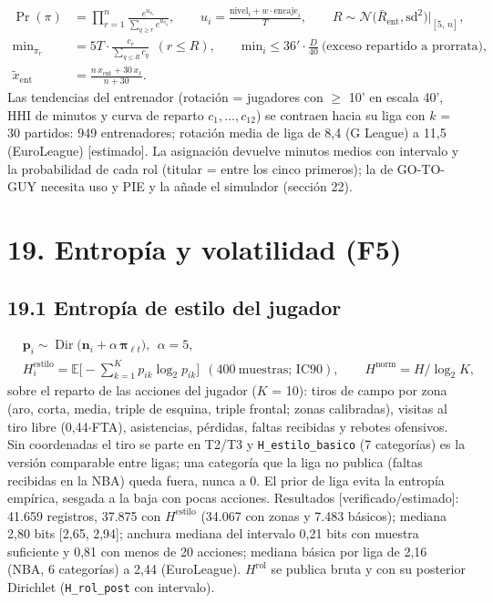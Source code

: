 \documentclass[10pt,a4paper]{article}
\begin{document}
\[
\begin{aligned} \Pr(\pi) &= \prod_{r=1}^{n} \frac{e^{u_{\pi_r}}}{\sum_{q \ge r} e^{u_{\pi_q}}}, \qquad u_i = \frac{\text{nivel}_i + w\cdot\text{encaje}_i}{T}, \qquad R \sim \mathcal N\big(\bar R_{\mathrm{ent}}, \mathrm{sd}^2\big)\big|_{[5,\,n]},\\ \mathrm{min}_{\pi_r} &= 5T \cdot \frac{c_r}{\sum_{q \le R} c_q}\ \ (r \le R), \qquad \mathrm{min}_i \le 36' \cdot \tfrac{D}{40}\ \text{(exceso repartido a prorrata)},\\ \tilde x_{\mathrm{ent}} &= \frac{n\,x_{\mathrm{ent}} + 30\,x_\ell}{n + 30} . \end{aligned}
\]
Las tendencias del entrenador (rotación = jugadores con \ensuremath{\geq} 10' en escala 40', HHI de minutos y curva de reparto $c_1,\dots,c_{12}$) se contraen hacia su liga con $k$ = 30 partidos: 949 entrenadores; rotación media de liga de 8,4 (G League) a 11,5 (EuroLeague) [estimado]. La asignación devuelve minutos medios con intervalo y la probabilidad de cada rol (titular = entre los cinco primeros); la de GO-TO-GUY necesita uso y PIE y la añade el simulador (sección 22).


\section*{19. Entropía y volatilidad (F5)}
\subsection*{19.1 Entropía de estilo del jugador}
\[
\begin{aligned} &\mathbf p_i \sim \operatorname{Dir}\big(\mathbf n_i + \alpha\,\boldsymbol\pi_{\ell t}\big),\ \ \alpha = 5,\\ &H^{\mathrm{estilo}}_i = \mathbb E\Big[-\sum_{k=1}^{K} p_{ik}\log_2 p_{ik}\Big] \ \ (400\ \text{muestras; IC90}), \qquad H^{\mathrm{norm}} = H/\log_2 K , \end{aligned}
\]
sobre el reparto de las acciones del jugador ($K$ = 10): tiros de campo por zona (aro, corta, media, triple de esquina, triple frontal; zonas calibradas), visitas al tiro libre (0,44\ensuremath{\cdot}FTA), asistencias, pérdidas, faltas recibidas y rebotes ofensivos. Sin coordenadas el tiro se parte en T2/T3 y \texttt{H\_estilo\_basico} (7 categorías) es la versión comparable entre ligas; una categoría que la liga no publica (faltas recibidas en la NBA) queda fuera, nunca a 0. El prior de liga evita la entropía empírica, sesgada a la baja con pocas acciones. Resultados [verificado/estimado]: 41.659 registros, 37.875 con $H^{\mathrm{estilo}}$ (34.067 con zonas y 7.483 básicos); mediana 2,80 bits [2,65, 2,94]; anchura mediana del intervalo 0,21 bits con muestra suficiente y 0,81 con menos de 20 acciones; mediana básica por liga de 2,16 (NBA, 6 categorías) a 2,44 (EuroLeague). $H^{\mathrm{rol}}$ se publica bruta y con su posterior Dirichlet (\texttt{H\_rol\_post} con intervalo).
\end{document}

